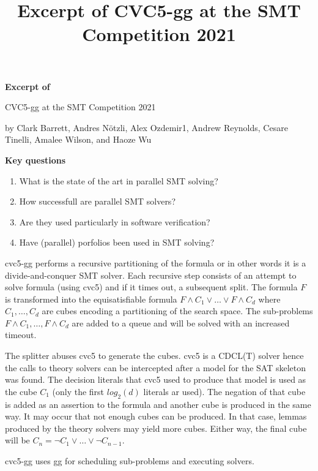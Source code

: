 \documentclass{scrartcl}
\title{Excerpt of CVC5-gg at the SMT Competition 2021}
\begin{document}
\begin{center}
    \Large{\textbf{Excerpt of}}

    \LARGE{CVC5-gg at the SMT Competition 2021}

    \large{by Clark Barrett, Andres Nötzli, Alex Ozdemir1, Andrew Reynolds,
    Cesare Tinelli, Amalee Wilson, and Haoze Wu}
\end{center}

\vspace{1cm}

\begin{addmargin}[0.2\linewidth]{0.2\linewidth}
    \begin{center}
        \textbf{Key questions}
    \end{center}
    \begin{enumerate}[i]
        \item What is the state of the art in parallel SMT solving?
        \item How successfull are parallel SMT solvers?
        \item Are they used particularly in software verification?
        \item Have (parallel) porfolios been used in SMT solving?
    \end{enumerate}
\end{addmargin}

\vspace{1cm}

cvc5-gg performs a recursive partitioning of the formula
or in other words it is a divide-and-conquer SMT solver.
Each recursive step consists of an attempt to solve formula (using cvc5)
and if it times out, a subsequent split.
The formula \(F\) is transformed into the equisatisfiable formula
\(F \wedge C_1 \vee \dots \vee F \wedge C_d\) where \(C_1, \dotsc, C_d\) are cubes
encoding a partitioning of the search space.
The sub-problems \(F \wedge C_1, \dotsc, F \wedge C_d\) are added to a queue
and will be solved with an increased timeout.

The splitter abuses cvc5 to generate the cubes.
cvc5 is a CDCL(T) solver hence the calls to theory solvers can be intercepted
after a model for the SAT skeleton was found.
The decision literals that cvc5 used to produce that model is used as the cube \(C_1\)
(only the first \(log_2(d)\) literals ar used).
The negation of that cube is added as an assertion to the formula
and another cube is produced in the same way.
It may occur that not enough cubes can be produced.
In that case, lemmas produced by the theory solvers may yield more cubes.
Either way, the final cube will be \(C_n = \neg C_1 \vee \dots \vee \neg C_{n-1}\).

cvc5-gg uses gg for scheduling sub-problems and executing solvers.
\end{document}
